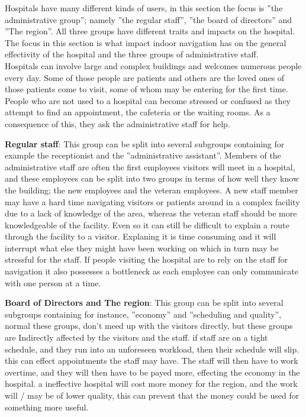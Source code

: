 Hospitals have many different kinds of users, in this section the focus is ''the administrative group''; namely ''the regular staff'', ''the board of directors'' and ''The region''. All three groups have different traits and impacts on the hospital. \\ The focus in this section is what impact indoor navigation has on the general effectivity of the hospital and the three groups of administrative staff.\\
Hospitals can involve large and complex buildings and welcomes numerous people every day. Some of those people are patients and others are the loved ones of those patients come to visit, some of whom may be entering for the first time. People who are not used to a hospital can become stressed or confused as they attempt to find an appointment, the cafeteria or the waiting rooms. As a consequence of this, they ask the administrative staff for help.

\textbf{Regular staff}: This group can be split into several subgroups containing for example the receptionist and the ''administrative assistant''. Members of the administrative staff are often the first employees visitors will meet in a hospital, and these employees can be split into two groups in terms of how well they know the building; the new employees and the veteran employees. A new staff member may have a hard time navigating visitors or patients around in a complex facility due to a lack of knowledge of the area, whereas the veteran staff should be more knowledgeable of the facility. Even so it can still be difficult to explain a route through the facility to a visitor. Explaning it is time consuming and it will interrupt what else they might have been working on which in turn may be stressful for the staff. If people visiting the hospital are to rely on the staff for navigation it also possesses a bottleneck as each employee can only communicate with one person at a time.

\textbf{Board of Directors and The region}: This group can be split into several subgroups containing for instance, ''economy'' and ''scheduling and quality'', normal these groups, don't meed up with the visitors directly, but these groups are Indirectly affected by the visitors and the staff. if staff are on a tight schedule, and they run into an unforeseen workload, then their schedule will slip. this can effect appointments the staff may have. The staff will then have to work overtime, and they will then have to be payed more, effecting the economy in the hospital. a ineffective hospital will cost more money for the region, and the work will / may be of lower quality, this can prevent that the money could be used for something more useful. 